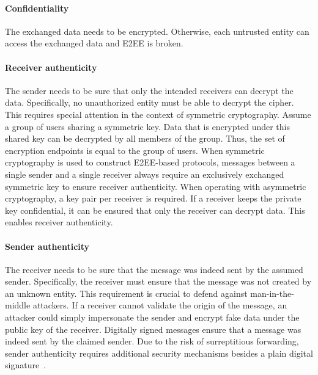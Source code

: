 \documentclass[../main.tex]{subfiles}
\begin{document}
\paragraph{Confidentiality}
The exchanged data needs to be encrypted. 
Otherwise, each untrusted entity can access the exchanged data and E2EE is broken.
\paragraph{Receiver authenticity}
The sender needs to be sure that only the intended receivers can decrypt the data.
Specifically, no unauthorized entity must be able to decrypt the cipher.
This requires special attention in the context of symmetric cryptography.
Assume a group of users sharing a symmetric key.
Data that is encrypted under this shared key can be decrypted by all members of the group.
Thus, the set of encryption endpoints is equal to the group of users.
When symmetric cryptography is used to construct E2EE-based protocols, messages between a single sender and a single receiver always require an exclusively exchanged symmetric key to ensure receiver authenticity.
When operating with asymmetric cryptography, a key pair per receiver is required.
If a receiver keeps the private key confidential, it can be ensured that only the receiver can decrypt data.
This enables receiver authenticity.
\paragraph{Sender authenticity} 
The receiver needs to be sure that the message was indeed sent by the assumed sender.
Specifically, the receiver must ensure that the message was not created by an unknown entity.
This requirement is crucial to defend against man-in-the-middle attackers.
If a receiver cannot validate the origin of the message, an attacker could simply impersonate the sender and encrypt fake data under the public key of the receiver.
Digitally signed messages ensure that a message was indeed sent by the claimed sender.
Due to the risk of surreptitious forwarding, sender authenticity requires additional security mechanisms besides a plain digital signature~\cite{Davis2001}.
\end{document}
